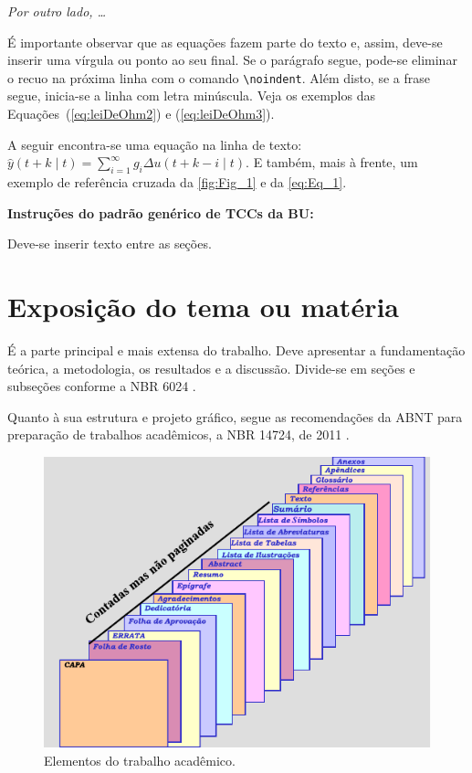 \emph{Por outro lado, \ldots}

É importante observar que as equações fazem parte do texto e, assim, deve-se inserir uma vírgula ou ponto ao seu final. Se o parágrafo segue, pode-se eliminar o recuo na próxima linha com o comando \verb!\noindent!. Além disto, se a frase segue, inicia-se a linha com letra minúscula. Veja os exemplos das Equações~(\ref{eq:leiDeOhm2}) e (\ref{eq:leiDeOhm3}).

A seguir encontra-se uma equação na linha de texto: $\hat{y}(t+k\mid t)= \sum^\infty_{i=1} g_i \Delta u(t+k-i\mid t)$. E também, mais à frente, um exemplo de referência cruzada da \autoref{fig:Fig_1} e da \autoref{eq:Eq_1}.

\pagebreak

\textbf{Instruções do padrão genérico de TCCs da BU:}

Deve-se inserir texto entre as seções.

\section{Exposição do tema ou matéria}

É a parte principal e mais extensa do trabalho. Deve apresentar a fundamentação teórica, a metodologia, os resultados e a discussão. Divide-se em seções e subseções conforme a NBR 6024 \cite{NBR6024:2012}.

Quanto à sua estrutura e projeto gráfico, segue as recomendações da \gls{ABNT} para preparação de trabalhos acadêmicos, a NBR 14724, de 2011 \cite{NBR14724:2011}.

\begin{figure}[htb]
	\caption{\label{fig:Fig_1}Elementos do trabalho acadêmico.}
	\begin{center}
		\includegraphics{images/imagem.pdf}
	\end{center}
\end{figure}

